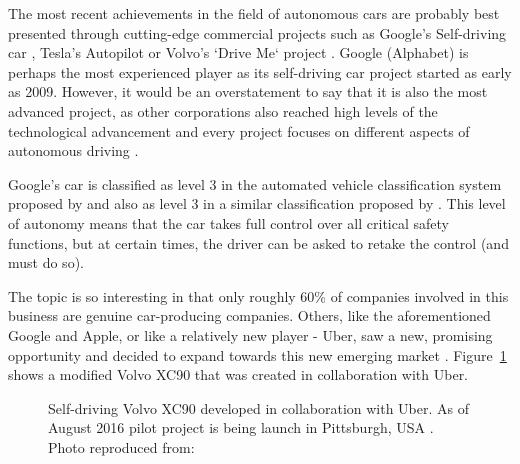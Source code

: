 \documentclass[11pt,english,twoside]{article}
\begin{document}
The most recent achievements in the field of autonomous cars are probably best presented through cutting-edge commercial projects such as Google's Self-driving car \citep{google1}, Tesla's Autopilot \citep{tesla1} or Volvo's `Drive Me` project \citep{volvo1}. Google (Alphabet) is perhaps the most experienced player as its self-driving car project started as early as 2009. However, it would be an overstatement to say that it is also the most advanced project, as other corporations also reached high levels of the technological advancement and every project focuses on different aspects of autonomous driving \citep{33comp}. 
\par
Google's car is classified as level 3 in the automated vehicle classification system proposed by \citet{nhtsa1} and also as level 3 in a similar classification proposed by \citet{sae1}. This level of autonomy means that the car takes full control over all critical safety functions, but at certain times, the driver can be asked to retake the control (and must do so).  
\par
The topic is so interesting in that only roughly 60\% of companies involved in this business are genuine car-producing companies. Others, like the aforementioned Google and Apple, or like a relatively new player  - Uber, saw a new, promising opportunity and decided to expand towards this new emerging market \citep{33comp}. Figure~\ref{fig:volvo} shows a modified Volvo XC90 that was created in collaboration with Uber.

\begin{figure}[!] %
\caption{Self-driving Volvo XC90 developed in collaboration with Uber. As of August 2016 pilot project is being launch in Pittsburgh, USA \citep{uberpittsburgh}. Photo reproduced from: \citet{volvo1}}
\label{fig:volvo}
\end{figure} 
\end{document}
